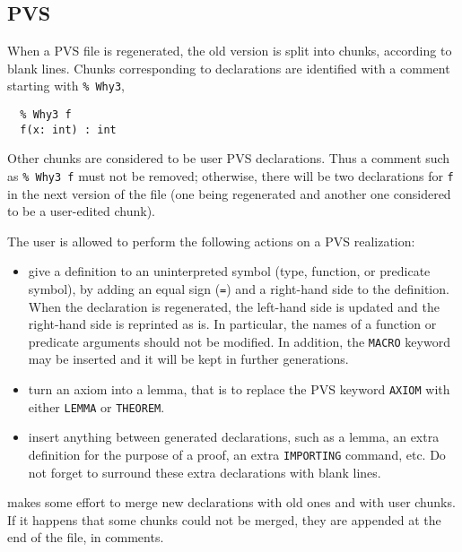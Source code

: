 \subsection{PVS}

When a PVS file is regenerated, the old version is split into chunks,
according to blank lines. Chunks corresponding to \why declarations
are identified with a comment starting with \verb+% Why3+, \eg
\begin{verbatim}
  % Why3 f
  f(x: int) : int
\end{verbatim}
Other chunks are considered to be user PVS declarations.
Thus a comment such as \verb+% Why3 f+ must not be removed;
otherwise, there will be two
declarations for \texttt{f} in the next version of the file (one being
regenerated and another one considered to be a user-edited chunk).

The user is allowed to perform the following actions on a PVS
realization:
\begin{itemize}
\item give a definition to an uninterpreted symbol (type, function, or
  predicate symbol), by adding an equal sign (\texttt{=}) and a
  right-hand side to the definition. When the declaration is
  regenerated, the left-hand side is updated and the right-hand side
  is reprinted as is. In particular, the names of a function or
  predicate arguments should not be modified. In addition, the
  \texttt{MACRO} keyword may be inserted and it will be kept in
  further generations.

\item turn an axiom into a lemma, that is to replace the PVS keyword
  \texttt{AXIOM} with either \texttt{LEMMA} or \texttt{THEOREM}.

\item insert anything between generated declarations, such as a lemma,
  an extra definition for the purpose of a proof, an extra
  \texttt{IMPORTING} command, etc. Do not forget to surround these
  extra declarations with blank lines.
\end{itemize}
\why makes some effort to merge new declarations with old ones
and with user chunks. If it happens that some chunks could not be
merged, they are appended at the end of the file, in comments.
